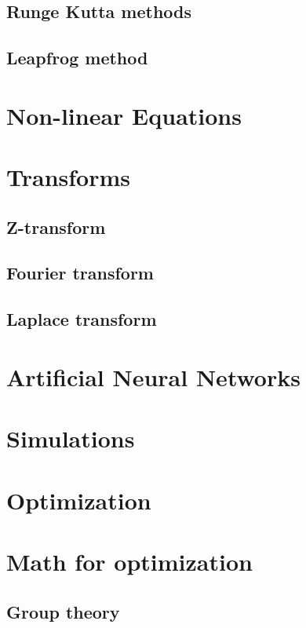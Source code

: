 \documentclass{article}
\begin{document}
\subsection{Runge Kutta methods}

\subsection{Leapfrog method}

\section{Non-linear Equations}

\section{Transforms}

\subsection{Z-transform}

\subsection{Fourier transform}

\subsection{Laplace transform}

\section{Artificial Neural Networks}

\section{Simulations}


\section*{Optimization}

\section{Math for optimization}

\subsection{Group theory}
\end{document}
